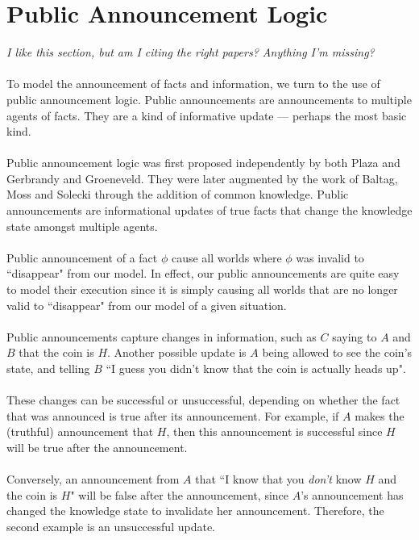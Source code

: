 \documentclass[12pt, a4paper, twoside]{article}
\begin{document}
\section{Public Announcement Logic}\label{pal}
{\em I like this section, but am I citing the right papers?
Anything I'm missing?}\\
\\
To model the announcement of facts and information, we turn to the use of public
announcement logic.
Public announcements are announcements to multiple agents of facts.
They are a kind of informative update --- perhaps the most basic kind.\\
\\
Public announcement logic was first proposed independently by both Plaza and
Gerbrandy and Groeneveld. \citep{plaza2007public,gelbrandy1997reasoning}
They were later augmented by the work of Baltag, Moss and Solecki through the
addition of common knowledge. \citep{baltag1998lpa}
Public announcements are informational updates of true facts that change the
knowledge state amongst multiple agents.\\
\\
Public announcement of a fact $\phi$ cause all worlds where $\phi$ was
invalid to ``disappear" from our model.
In effect, our public announcements are quite easy to model their execution
since it is simply causing all worlds that are no longer valid to ``disappear"
from our model of a given situation.\\
\\
Public announcements capture changes in information, such as $C$ saying to
$A$ and $B$ that the coin is $H$.
Another possible update is $A$ being allowed to see the coin's state, and
telling $B$ ``I guess you didn't know that the coin is actually heads up".\\
\\
These changes can be successful or unsuccessful, depending on whether the fact
that was announced is true after its announcement.
For example, if $A$ makes the (truthful) announcement that $H$, then this
announcement is successful since $H$ will be true after the announcement.\\
\\
Conversely, an announcement from $A$ that ``I know that you {\em don't} know $H$
and the coin is $H$" will be false after the announcement, since $A$'s
announcement has changed the knowledge state to invalidate her
announcement.
Therefore, the second example is an unsuccessful update.\\
\end{document}
